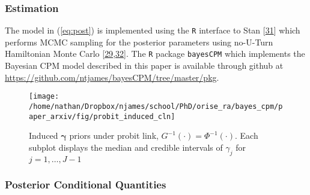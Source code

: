 \documentclass[
]{article}
\begin{document}
\hypertarget{estimation}{%
\subsubsection{Estimation}\label{estimation}}

The model in (\ref{eq:post}) is implemented using the \texttt{R} interface to Stan {[}\protect\hyperlink{ref-stan_development_team_rstan:_2018}{31}{]} which performs MCMC sampling for the posterior parameters using no-U-Turn Hamiltonian Monte Carlo {[}\protect\hyperlink{ref-gelman_bayesian_2014}{29},\protect\hyperlink{ref-neal_mcmc_2011}{32}{]}. The \texttt{R} package \texttt{bayesCPM} which implements the Bayesian CPM model described in this paper is available through github at \url{https://github.com/ntjames/bayesCPM/tree/master/pkg}.

\begin{figure}

{\centering \texttt{[image: /home/nathan/Dropbox/njames/school/PhD/orise\_ra/bayes\_cpm/paper\_arxiv/fig/probit\_induced\_cln]} 

}

\caption{Induced $\boldsymbol{\gamma}$ priors under probit link, $G^{-1}(\cdot)=\Phi^{-1}(\cdot)$. Each subplot displays the median and credible intervals of $\gamma_j$ for $j=1,\ldots,J-1$}\label{fig:probit-induced}
\end{figure}

\hypertarget{posterior-conditional-quantities}{%
\subsubsection{Posterior Conditional Quantities}\label{posterior-conditional-quantities}}
\end{document}
